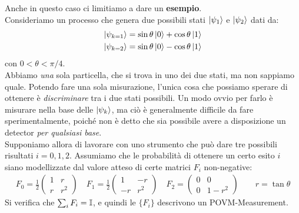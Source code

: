 \documentclass[../../InformazioneQuantistica.tex]{subfiles}
\begin{document}
Anche in questo caso ci limitiamo a dare un \textbf{esempio}.\\
Consideriamo un processo che genera due possibili stati $\Ket{\psi_1}$ e $\Ket{\psi_2}$ dati da:
\begin{align*}
\Ket{\psi_{k=1}} &= \sin\theta \Ket{0} + \cos\theta \Ket{1}\\
\Ket{\psi_{k=2}} &= \sin\theta \Ket{0} - \cos\theta \Ket{1}
\end{align*}
con $0 < \theta < \pi/4$.\\
Abbiamo \textit{una} sola particella, che si trova in uno dei due stati, ma non sappiamo quale. Potendo fare una sola misurazione, l'unica cosa che possiamo sperare di ottenere è \textit{discriminare} tra i due stati possibili. Un modo ovvio per farlo è misurare nella base delle $\Ket{\psi_k}$, ma ciò è generalmente difficile da fare sperimentalmente, poiché non è detto che sia possibile avere a disposizione un detector \textit{per qualsiasi base}.\\

Supponiamo allora di lavorare con uno strumento che può dare tre possibili risultati $i=0,1,2$. Assumiamo che le probabilità di ottenere un certo esito $i$ siano modellizzate dal valore atteso di certe matrici $F_i$ non-negative:
\begin{align*}
F_0 = \frac{1}{2}\begin{pmatrix}
1 & r\\
r & r^2\end{pmatrix}
\quad F_1 = \frac{1}{2}\begin{pmatrix} 1 & -r\\ -r & r^2 \end{pmatrix}\quad
F_2 = \begin{pmatrix} 0 & 0\\ 0 & 1-r^2 \end{pmatrix} \qquad r=\tan\theta
\end{align*}
Si verifica che $\sum_i F_i = \mathbb{I}$, e quindi le $\{F_i\}$ descrivono un POVM-Measurement.\\
\end{document}
